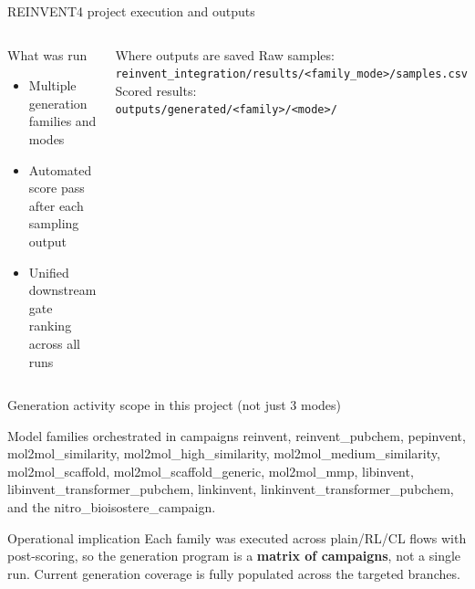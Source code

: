\documentclass[aspectratio=169,10pt]{beamer}
\begin{document}
\begin{frame}{REINVENT4 project execution and outputs}
  \begin{columns}[T]
      \begin{block}{What was run}
        \begin{itemize}
          \item Multiple generation families and modes
          \item Automated score pass after each sampling output
          \item Unified downstream gate ranking across all runs
        \end{itemize}
      \end{block}
      \begin{block}{Where outputs are saved}
        Raw samples:\\
        {\scriptsize\texttt{reinvent\_integration/results/<family\_mode>/samples.csv}}\\
        Scored results:\\
        {\scriptsize\texttt{outputs/generated/<family>/<mode>/}}
      \end{block}
  \end{columns}
\end{frame}

\begin{frame}{Generation activity scope in this project (not just 3 modes)}
  \small
  \begin{block}{Model families orchestrated in campaigns}
    reinvent, reinvent\_pubchem, pepinvent, mol2mol\_similarity,
    mol2mol\_high\_similarity, mol2mol\_medium\_similarity,
    mol2mol\_scaffold, mol2mol\_scaffold\_generic, mol2mol\_mmp,
    libinvent, libinvent\_transformer\_pubchem, linkinvent,
    linkinvent\_transformer\_pubchem, and the nitro\_bioisostere\_campaign.
  \end{block}

  \begin{exampleblock}{Operational implication}
    Each family was executed across plain/RL/CL flows with post-scoring, so
    the generation program is a \textbf{matrix of campaigns}, not a single run.
    Current generation coverage is fully populated across the targeted branches.
  \end{exampleblock}
\end{frame}
\end{document}
